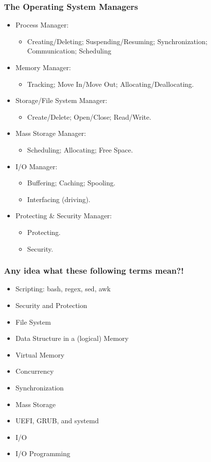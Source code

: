 \documentclass[aspectratio=169, xcolor=table, notheorems, hyperref={pdfpagelabels=false}]{beamer}
\begin{document}
\begin{frame}
\frametitle{The Operating System Managers}
\begin{itemize}
\item Process Manager: 
\begin{itemize}
\item Creating/Deleting; Suspending/Resuming; Synchronization; Communication; Scheduling
\end{itemize}
\item Memory Manager:
\begin{itemize}
\item Tracking; Move In/Move Out; Allocating/Deallocating.
\end{itemize}
\item Storage/File System Manager:
\begin{itemize}
\item Create/Delete; Open/Close; Read/Write.
\end{itemize}
\item Mass Storage Manager:
\begin{itemize}
\item Scheduling; Allocating; Free Space.
\end{itemize}
\item I/O Manager:
\begin{itemize}
\item Buffering; Caching; Spooling.
\item Interfacing (driving).
\end{itemize}
\item Protecting \& Security Manager:
\begin{itemize}
\item Protecting.
\item Security.
\end{itemize}
\end{itemize}
\end{frame}

\begin{frame}
\frametitle{Any idea what these following terms mean?!}
\begin{itemize}
\item Scripting: bash, regex, sed, awk
\item Security and Protection
\item File System
\item Data Structure in a (logical) Memory
\item Virtual Memory
\item Concurrency
\item Synchronization
\item Mass Storage
\item UEFI, GRUB, and systemd
\item I/O
\item I/O Programming
\end{itemize}
\end{frame}
\end{document}

